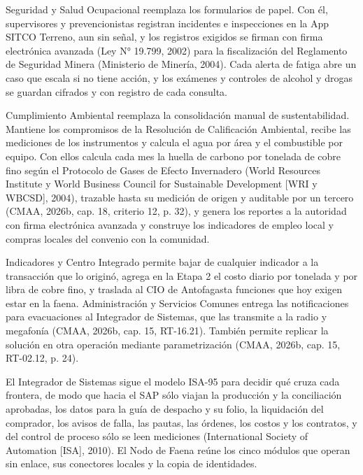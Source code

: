 \documentclass[subdoc]{../../comun/overfore}
\begin{document}
Seguridad y Salud Ocupacional reemplaza los formularios de papel. Con él, supervisores y prevencionistas registran incidentes e inspecciones en la App SITCO Terreno, aun sin señal, y los registros exigidos se firman con firma electrónica avanzada (Ley N° 19.799, 2002) para la fiscalización del Reglamento de Seguridad Minera (Ministerio de Minería, 2004). Cada alerta de fatiga abre un caso que escala si no tiene acción, y los exámenes y controles de alcohol y drogas se guardan cifrados y con registro de cada consulta.

Cumplimiento Ambiental reemplaza la consolidación manual de sustentabilidad. Mantiene los compromisos de la Resolución de Calificación Ambiental, recibe las mediciones de los instrumentos y calcula el agua por área y el combustible por equipo. Con ellos calcula cada mes la huella de carbono por tonelada de cobre fino según el Protocolo de Gases de Efecto Invernadero (World Resources Institute y World Business Council for Sustainable Development [WRI y WBCSD], 2004), trazable hasta su medición de origen y auditable por un tercero (CMAA, 2026b, cap. 18, criterio 12, p. 32), y genera los reportes a la autoridad con firma electrónica avanzada y construye los indicadores de empleo local y compras locales del convenio con la comunidad.

Indicadores y Centro Integrado permite bajar de cualquier indicador a la transacción que lo originó, agrega en la Etapa 2 el costo diario por tonelada y por libra de cobre fino, y traslada al CIO de Antofagasta funciones que hoy exigen estar en la faena. Administración y Servicios Comunes entrega las notificaciones para evacuaciones al Integrador de Sistemas, que las transmite a la radio y megafonía (CMAA, 2026b, cap. 15, RT-16.21). También permite replicar la solución en otra operación mediante parametrización (CMAA, 2026b, cap. 15, RT-02.12, p. 24).

El Integrador de Sistemas sigue el modelo ISA-95 para decidir qué cruza cada frontera, de modo que hacia el SAP sólo viajan la producción y la conciliación aprobadas, los datos para la guía de despacho y su folio, la liquidación del comprador, los avisos de falla, las pautas, las órdenes, los costos y los contratos, y del control de proceso sólo se leen mediciones (International Society of Automation [ISA], 2010). El Nodo de Faena reúne los cinco módulos que operan sin enlace, sus conectores locales y la copia de identidades.
\end{document}
